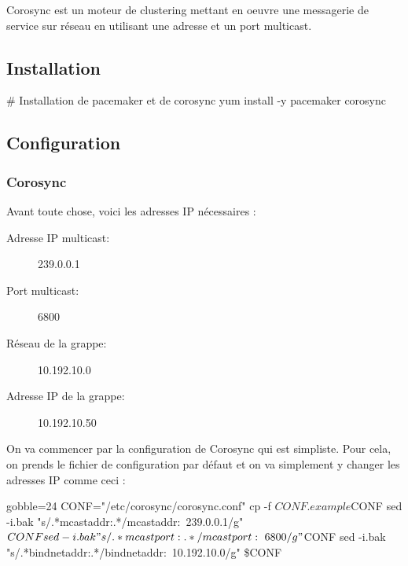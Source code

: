 \documentclass[11pt,a4paper]{report}
\begin{document}
                Corosync est un moteur de clustering mettant en oeuvre une messagerie de service sur réseau en utilisant une adresse et un port multicast.
                
            \subsection{Installation}
                
                \begin{bashcode}
                    # Installation de pacemaker et de corosync
                    yum install -y pacemaker corosync
                \end{bashcode}
                
            \subsection{Configuration}
                
                \subsubsection{Corosync}
                    
                    Avant toute chose, voici les adresses IP nécessaires :\\
                    
                    \begin{description}
                        \item[Adresse IP multicast:] 239.0.0.1
                        \item[Port multicast:] 6800
                        \item[Réseau de la grappe:] 10.192.10.0
                        \item[Adresse IP de la grappe:] 10.192.10.50
                    \end{description}
                    
                    On va commencer par la configuration de Corosync qui est simpliste. Pour cela, on prends le fichier de configuration par défaut et on va simplement y changer les adresses IP comme ceci :\\
                    
                    \begin{bashcode*}{gobble=24}
                        CONF="/etc/corosync/corosync.conf"
                        cp -f $CONF.example $CONF
                        sed -i.bak "s/.*mcastaddr:.*/mcastaddr:\ 239.0.0.1/g" $CONF
                        sed -i.bak "s/.*mcastport:.*/mcastport:\ 6800/g" $CONF
                        sed -i.bak "s/.*bindnetaddr:.*/bindnetaddr:\ 10.192.10.0/g" \$CONF
                    \end{bashcode*}
                    
\end{document}

